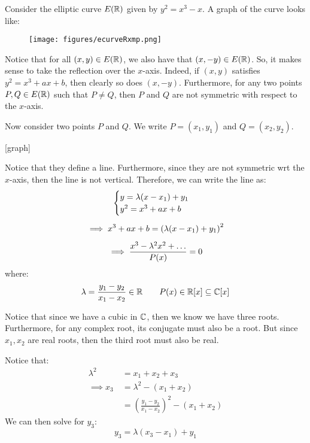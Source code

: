 \documentclass{article}
\begin{document}
Consider the elliptic curve $ E(\mathbb{R}) $ given by $ y^{2} = x^{3} - x $.
A graph of the curve looks like:

\begin{figure}[ht]
    \centering
    \texttt{[image: figures/ecurveRxmp.png]}
\end{figure}

Notice that for all $ (x, y) \in E(\mathbb{R}) $, we also have that $ (x, -y) \in E(\mathbb{R}) $.
So, it makes sense to take the reflection over the $ x $-axis.
Indeed, if $ (x, y) $ satisfies $ y^{2} = x^{3} + ax + b $,
then clearly so does $ (x, -y) $. \vsp
%
Furthermore, for any two points $ P, Q \in E(\mathbb{R}) $ such that $ P \neq Q $,
then $ P $ and $ Q $ are not symmetric with respect to the $ x $-axis.

Now consider two points $ P $ and $ Q $.
We write $ P = (x_{1}, y_{1}) $ and $ Q = (x_{2}, y_{2}) $.

[graph]

Notice that they define a line. Furthermore, since they are not symmetric wrt the $ x $-axis,
then the line is not vertical. Therefore, we can write the line as:
\begin{gather*}
    \begin{cases} 
    y = \lambda(x - x_{1}) + y_{1} \\
    y^{2} = x^{3} + ax + b
    \end{cases} \vsp
    \implies x^{3} + ax + b = \left( \lambda(x - x_{1}) + y_{1} \right)^{2} \vsp
    \implies \frac{x^{3} - \lambda^{2}x^{2} + \dots}{P(x)} = 0
\end{gather*}
where:
\begin{equation*}
    \lambda = \frac{y_{1} - y_{2}}{x_{1} - x_{2}} \in \mathbb{R} \qquad
    P(x) \in \mathbb{R}[x] \subseteq \mathbb{C}[x]
\end{equation*}

Notice that since we have a cubic in $ \mathbb{C} $, then we know we have three roots.
Furthermore, for any complex root, its conjugate must also be a root.
But since $ x_{1}, x_{2} $ are real roots, then the third root must also be real.

Notice that:
\begin{align*}
    \lambda^{2} & \ = x_{1} + x_{2} + x_{3} \\
    \implies x_{3} & \ = \lambda^{2} - (x_{1} + x_{2}) \\
                   & \ = \left( \frac{y_{1} - y_{2}}{x_{1} - x_{2}} \right)^{2} - (x_{1} + x_{2})
\end{align*}
We can then solve for $ y_{3} $:
\begin{equation*}
    y_{3} = \lambda(x_{3} - x_{1}) + y_{1}
\end{equation*}
\end{document}
